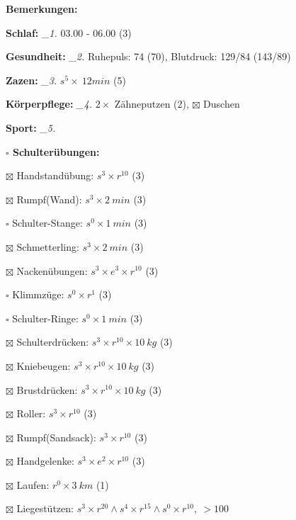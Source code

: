 \documentclass[10pt,a4paper]{article}
\newcommand\prop[1] {{\color {alizarin} {\bf #1}}}             %
\newcommand\mand[1] {{\color {burntorange} {\bf #1}}}          %
\newcommand\topspace{\vskip -15pt \hskip 20pt}
\newcommand\n[1] { {\sl #1.} \hskip 5pt }
\begin{document}
\begin{mdframed}[style=daystyle]
  \begin{labeling}{{\mand {Bemerkungen:}}}
    \setlength\itemsep{-3pt}
  \item[{\mand {Schlaf:}}]        \n{\_1} 03.00 - 06.00 (3)
  \item[{\mand {Gesundheit:}}]    \n{\_2} Ruhepuls: 74 (70), Blutdruck: 129/84 (143/89)
  \item[{\mand {Zazen:}}]         \n{\_3} $s^5 \times\ 12 min$ (5)
  \item[{\mand {Körperpflege:}}]  \n{\_4} $2 \times$ Zähneputzen (2), $\boxtimes$ Duschen
  \item[{\mand {Sport:}}]         \n{\_5}
    \topspace
    \begin{minipage}{0.75\textwidth}  
      \begin{labeling}{\prop {$\square$ {Schulterübungen:}}} 
        \setlength\itemsep{-3pt}
      \item[$\boxtimes$ Handstandübung:]  $s^3 \times r^{10}$ (3)
      \item[$\boxtimes$ Rumpf(Wand):]     $s^3 \times 2\ min$ (3)
      \item[$\square$ Schulter-Stange:] $s^0 \times 1\ min$ (3)
      \item[$\boxtimes$ Schmetterling:]   $s^3 \times 2\ min$ (3)
      \item[$\boxtimes$ Nackenübungen:]   $s^3 \times e^3 \times r^{10}$ (3)
      \item[$\square$ Klimmzüge:]       $s^0 \times r^1$ (3)
      \item[$\square$ Schulter-Ringe:]  $s^0 \times 1\ min$ (3)
      \item[$\boxtimes$ Schulterdrücken:] $s^3 \times r^{10} \times 10\ kg$ (3)
      \item[$\boxtimes$ Kniebeugen:]      $s^3 \times r^{10} \times 10\ kg$ (3)
      \item[$\boxtimes$ Brustdrücken:]    $s^3 \times r^{10} \times 10\ kg$ (3)
      \item[$\boxtimes$ Roller:]          $s^3 \times r^{10}$ (3)
      \item[$\boxtimes$ Rumpf(Sandsack):] $s^3 \times r^{10}$ (3)
      \item[$\boxtimes$ Handgelenke:]     $s^3 \times e^2 \times r^{10}$ (3)
      \item[$\boxtimes$ Laufen:]          $r^0 \times 3\ km$ (1)
      \item[$\boxtimes$ Liegestützen:]    $s^3 \times r^{20} \land s^4 \times r^{15} \land s^0 \times r^{10},\ > 100$

\end{labeling}
\end{minipage}
\end{labeling}
\end{mdframed}
\end{document}
